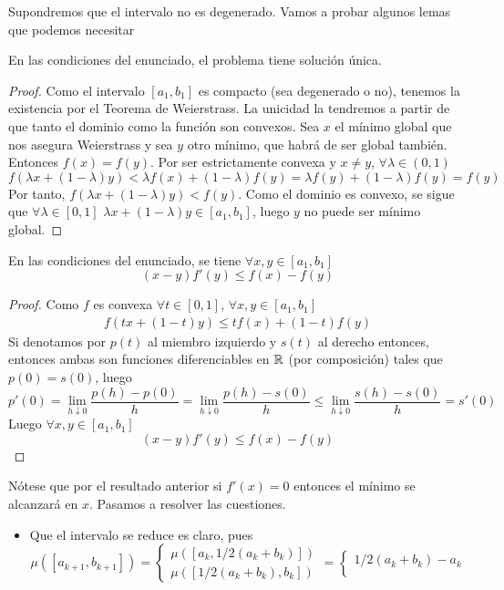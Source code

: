 \documentclass[twoside]{article}
\begin{document}
\begin{solucion} Supondremos que el intervalo no es degenerado. Vamos a probar algunos lemas que podemos necesitar
\begin{lemma}
En las condiciones del enunciado, el problema tiene solución única.
\begin{proof}
Como el intervalo $[a_1,b_1]$ es compacto (sea degenerado o no), tenemos la existencia por el Teorema de Weierstrass. La unicidad la tendremos a partir de que tanto el dominio como la función son convexos. Sea $x$ el mínimo global que nos asegura Weierstrass y sea $y$ otro mínimo, que habrá de ser global también. Entonces $f(x)=f(y)$. Por ser estrictamente convexa y $x\neq y$, $\forall \lambda \in (0,1)$
$$f(\lambda x+(1-\lambda)y) < \lambda f(x)+(1-\lambda)f(y) = \lambda f(y)+(1-\lambda)f(y) = f(y) $$
Por tanto, $f(\lambda x+(1-\lambda)y) < f(y)$. Como el dominio es convexo, se sigue que $\forall \lambda \in[0,1]$ $\lambda x+(1-\lambda)y \in [a_1,b_1]$, luego $y$ no puede ser mínimo global. 
\end{proof}
\end{lemma}
\begin{lemma}
En las condiciones del enunciado, se tiene $\forall x,y\in[a_1,b_1]$
$$
(x-y)f'(y)\leq f(x)-f(y)
$$
\begin{proof}
Como $f$ es convexa $\forall t \in [0,1]$, $\forall x,y\in [a_1,b_1]$
\begin{gather*}
f(tx+(1-t)y)\leq tf(x)+(1-t)f(y)
\end{gather*} 
Si denotamos por $p(t)$ al miembro izquierdo y $s(t)$ al derecho entonces, entonces ambas son funciones diferenciables en $\R$ (por composición) tales que $p(0)=s(0)$, luego
$$
p'(0)=\lim_{h\downarrow 0}\frac{p(h)-p(0)}{h} = \lim_{h\downarrow 0}\frac{p(h)-s(0)}{h} \leq \lim_{h\downarrow 0}\frac{s(h)-s(0)}{h} = s'(0)
$$
Luego $\forall x,y\in [a_1,b_1]$
$$
(x-y)f'(y)\leq f(x)-f(y)
$$
\end{proof}
\end{lemma}
Nótese que por el resultado anterior si $f'(x)=0$ entonces el mínimo se alcanzará en $x$. Pasamos a resolver las cuestiones.
\begin{itemize}
\item Que el intervalo se reduce es claro, pues
$$\mu([a_{k+1},b_{k+1}]) = \begin{cases}
\mu([a_k,1/2(a_k+b_k)])\\
\mu([1/2(a_k+b_k),b_k])
\end{cases}
= \begin{cases}
1/2(a_k+b_k)-a_k\\

\end{cases}$$
\end{itemize}
\end{solucion}
\end{document}
